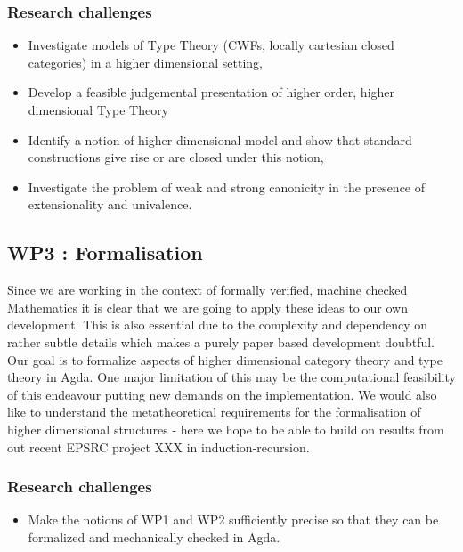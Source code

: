 \documentclass[twocolumn,a4paper,11pt]{article}
\begin{document}
{\subsubsection*{Research challenges}
\label{sec:rsearch-challenges}

\begin{itemize}
\item Investigate models of Type Theory (CWFs, locally cartesian
  closed categories) in a higher dimensional setting,

\item Develop a feasible judgemental presentation of higher order,
  higher dimensional Type Theory

\item Identify a notion of higher dimensional model and show that
  standard constructions give rise or are closed under this notion,

\item Investigate the problem of weak and strong canonicity
  in the presence of extensionality and univalence.
\end{itemize}

\subsection*{WP3 : Formalisation} 
\label{sec:wp:qio}

Since we are working in the context of formally verified, machine
checked Mathematics it is clear that we are going to apply these ideas
to our own development. This is also essential due to the complexity
and dependency on rather subtle details which makes a purely paper
based development doubtful. Our goal is to formalize aspects of higher
dimensional category theory and type theory in Agda. One major
limitation of this may be the computational feasibility of this
endeavour putting new demands on the implementation. We would also
like to understand the metatheoretical requirements for the
formalisation of higher dimensional structures - here we hope to be
able to build on results from out recent EPSRC project XXX in
induction-recursion. 

\subsubsection*{Research challenges}

\begin{itemize}
\item Make the notions of WP1 and WP2 sufficiently precise so that they
  can be formalized and mechanically checked in Agda.


\end{itemize}}
\end{document}
